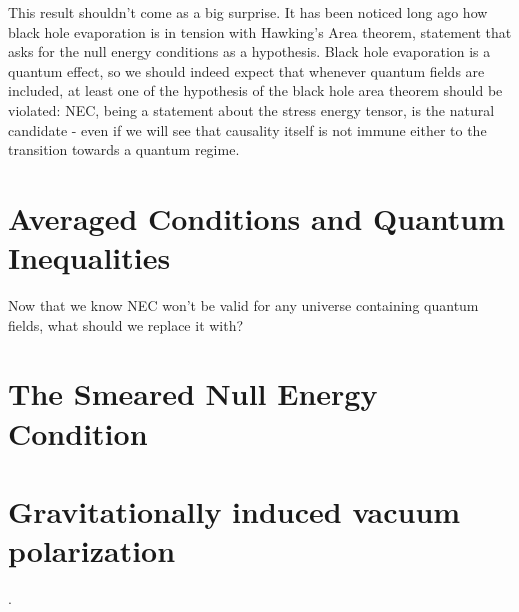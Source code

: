 This result shouldn't come as a big surprise. It has been noticed long ago how black hole evaporation is in tension with Hawking's Area theorem, statement that asks for the null energy conditions as a hypothesis. Black hole evaporation is a quantum effect, so we should indeed expect that whenever quantum fields are included, at least one of the hypothesis of the black hole area theorem should be violated: NEC, being a statement about the stress energy tensor, is the natural candidate - even if we will see that causality itself is not immune either to the transition towards a quantum regime.

\section{Averaged Conditions and Quantum Inequalities}
Now that we know NEC won't be valid for any universe containing quantum fields, what should we replace it with?



\section{The Smeared Null Energy Condition}
\label{sec:SNEC}
	
\section[]{Gravitationally induced vacuum polarization}
.
	
	
	

	
	
	
	
	




